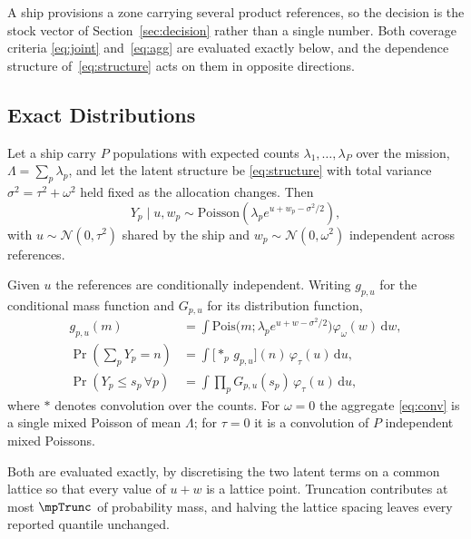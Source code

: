A ship provisions a zone carrying several product references, so the decision is
the stock vector of Section~\ref{sec:decision} rather than a single number. Both
coverage criteria \eqref{eq:joint} and~\eqref{eq:agg} are evaluated exactly below,
and the dependence structure of~\eqref{eq:structure} acts on them in opposite
directions.

\subsection{Exact Distributions}
Let a ship carry $P$ populations with expected counts $\lambda_1,\dots,\lambda_P$
over the mission, $\Lambda=\sum_p\lambda_p$, and let the latent structure be
\eqref{eq:structure} with total variance $\sigma^2=\tau^2+\omega^2$ held fixed as
the allocation changes. Then
\begin{equation}
Y_p\mid u,w_p\sim\mathrm{Poisson}\!\left(\lambda_p
e^{u+w_p-\sigma^2/2}\right),
\label{eq:multi}
\end{equation}
with $u\sim\mathcal N(0,\tau^2)$ shared by the ship and
$w_p\sim\mathcal N(0,\omega^2)$ independent across references.

\begin{proposition}
\label{prop:multi}
Given $u$ the references are conditionally independent. Writing
$g_{p,u}$ for the conditional mass function and $G_{p,u}$ for its distribution
function,
\begin{align}
g_{p,u}(m)&=\int \mathrm{Pois}\big(m;\lambda_p e^{u+w-\sigma^2/2}\big)
          \varphi_\omega(w)\,\mathrm dw,
\label{eq:convb}\\
\Pr(\textstyle\sum_pY_p=n)&=\int\big[\ast_{p}\,g_{p,u}\big](n)\,
          \varphi_\tau(u)\,\mathrm du,
\label{eq:conv}\\
\Pr(Y_p\le s_p\,\forall p)&=\int\textstyle\prod_{p}G_{p,u}(s_p)\,
          \varphi_\tau(u)\,\mathrm du,
\label{eq:jointexact}
\end{align}
where $\ast$ denotes convolution over the counts. For $\omega=0$ the aggregate
\eqref{eq:conv} is a single mixed Poisson of mean $\Lambda$; for $\tau=0$ it is a
convolution of $P$ independent mixed Poissons.
\end{proposition}

Both are evaluated exactly, by discretising the two latent terms on a common
lattice so that every value of $u+w$ is a lattice point. Truncation contributes at
most $\mpTrunc$ of probability mass, and halving the lattice spacing leaves every
reported quantile unchanged.

